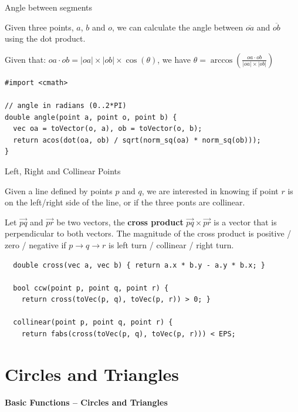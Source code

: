 \begin{frame}[fragile]{Angle between segments}

Given three points, $a$, $b$ and $o$, we can calculate
the angle between $\overline{oa}$ and $\overline{ob}$ using the dot product.\medskip

Given that: $oa\cdot ob = |oa|\times|ob|\times\cos(\theta)$, we have $\theta = \arccos(\frac{oa\cdot ob}{|oa|\times|ob|})$\bigskip

{\smaller

\begin{exampleblock}{}
\begin{verbatim}
#import <cmath>

// angle in radians (0..2*PI)
double angle(point a, point o, point b) {
  vec oa = toVector(o, a), ob = toVector(o, b);
  return acos(dot(oa, ob) / sqrt(norm_sq(oa) * norm_sq(ob)));
}
\end{verbatim}
\end{exampleblock}}
\end{frame}

\begin{frame}[fragile]{Left, Right and Collinear Points}

  Given a line defined by points $p$ and $q$, we are interested in knowing if point $r$ is on the left/right side of the line, or if the three ponts are collinear.\bigskip

  Let $\vec{pq}$ and $\vec{pr}$ be two vectors, the {\bf cross product} $\vec{pq} \times \vec{pr}$ is a vector that is perpendicular to both vectors. The  magnitude of the cross product is positive / zero / negative if $p \to q \to r$ is left turn / collinear / right turn.

  {\smaller
  \begin{exampleblock}{}
  \begin{verbatim}
  double cross(vec a, vec b) { return a.x * b.y - a.y * b.x; }

  bool ccw(point p, point q, point r) {
    return cross(toVec(p, q), toVec(p, r)) > 0; }

  collinear(point p, point q, point r) {
    return fabs(cross(toVec(p, q), toVec(p, r))) < EPS;
  \end{verbatim}
  \end{exampleblock}
  }
\end{frame}

\section{Circles and Triangles}
\begin{frame}
  \centering
  {\bf Basic Functions -- Circles and Triangles}
\end{frame}

